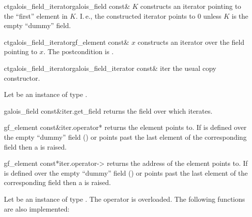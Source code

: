 \begin{fcode}{ct}{galois_field_iterator}{galois_field const& $K$}
  constructs an iterator pointing to the ``first'' element in $K$. I.\,e., the
  constructed iterator points to $0$ unless $K$ is the empty ``dummy'' field.
\end{fcode}

\begin{fcode}{ct}{galois_field_iterator}{gf_element const& $x$}
  constructs an iterator over the field  pointing to
  $x$. The postcondition is .  
\end{fcode}

\begin{fcode}{ct}{galois_field_iterator}{galois_field_iterator const& iter}
  the usual copy constructor.
\end{fcode}



\ACCS

Let  be an instance of type .

\begin{cfcode}{galois_field const&}{iter.get_field}{}
  returns the field over which  iterates.
\end{cfcode}

\begin{cfcode}{gf_element const&}{iter.operator*}{}
  returns the element  points to. If  is defined over
  the empty ``dummy'' field () or
   points past the last element of the corresponding field then a
   is raised.
\end{cfcode}

\begin{cfcode}{gf_element const*}{iter.operator->}{}
  returns the address of the element  points to.
  If  is defined over the empty ``dummy'' field
  () or  points past the
  last element of the corresponding field then a  is
  raised. 
\end{cfcode}


\ASGN

Let  be an instance of type .
The operator \code{=} is overloaded. The following functions are also
implemented: 

